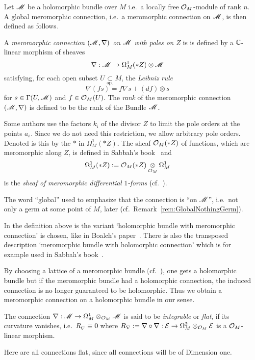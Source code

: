 Let $\mathscr{M}$ be a holomorphic bundle over $M$ i.e.\ a locally free $\mathcal{O}_M$-module
of rank $n$.
A global meromorphic connection, i.e.\ a meromorphic connection on $\mathscr{M}$, is
then defined as follows.
\begin{defn}\label{defn:mercon}
  A \emph{meromorphic connection $(\mathscr{M},\nabla)$ on $\mathscr{M}$ with poles on $Z$} is
  is defined by a $\mathbb{C}$-linear morphism of sheaves
  \[
    \nabla:\mathscr{M}\to\Omega_M^1(*Z)\otimes\mathscr{M}
  \]
  satisfying, for each open subset $U\underset{\text{op.}}{\subset} M$, the
  \emph{Leibniz rule}
    \[
      \nabla(fs)=f\nabla s+(df)\otimes s
    \]
  for $s\in\Gamma(U,\mathscr{M})$ and $f\in\mathcal{O}_M(U)$.
  The \emph{rank} of the meromorphic connection $(\mathscr{M},\nabla)$ is defined to be
  the rank of the Bundle $\mathscr{M}$.
  \begin{s-rem}
    Some authors use the factors $k_i$ of the divisor $Z$ to limit the pole
    orders at the points $a_i$. Since we do not need this restriction, we allow
    arbitrary pole orders. Denoted is this by the $*$ in $\Omega_M^1(*Z)$.
    The sheaf $\mathcal{O}_M(*Z)$ of functions, which are meromorphic along $Z$, is
    defined in Sabbah's book~\cite[Sec.0.8]{sabbah2007isomonodromic} and
    \[
      \Omega_M^1(*Z):=\mathcal{O}_M(*Z)\underset{\mathcal{O}_M}\otimes\Omega_M^1
    \]
    is the \emph{sheaf of meromorphic differential $1$-forms}
    (cf.\ \cite[Sec.0.9.b]{sabbah2007isomonodromic}).
  \end{s-rem}
\end{defn}
The word ``global'' used to emphasize that the connection is ``on $\mathscr{M}$'', i.e.\
not only a germ at some point of $M$,  later
(cf.\ Remark~\ref{rem:GlobalNothingGerm}).

In the definition above is the variant `holomorphic bundle with meromorphic
connection' is chosen, like in Boalch's paper~\cite{boalch}.
There is also the transposed description `meromorphic bundle with holomorphic
connection' which is for example used in Sabbah's
book~\cite{sabbah2007isomonodromic}.

By choosing a lattice of a meromorphic bundle
(cf.\ \cite[Def.0.8.3]{sabbah2007isomonodromic}), one gets a holomorphic bundle
but if the meromorphic bundle had a holomorphic connection, the induced
connection \rewrite{on the lattice} is no longer guaranteed to be holomorphic.
Thus we obtain a meromorphic connection on a holomorphic bundle in our sense.

\begin{defn}
  The connection $\nabla:\mathscr{M}\to \Omega_M^1\otimes_{\mathcal{O}_M}\mathscr{M}$ is said to be
  \emph{integrable} or \emph{flat}, if its curvature vanishes, i.e.\
  $R_\nabla\equiv0$
  where $R_\nabla:=\nabla\circ\nabla:\mathcal{E}\to\Omega_M^2\otimes_{\mathcal{O}_M}\mathcal{E}$ is a
  $\mathcal{O}_M$-linear morphism.
  \begin{s-rem}
    Here are all connections flat, since all connections will be of Dimension
    one.
  \end{s-rem}
\end{defn}

